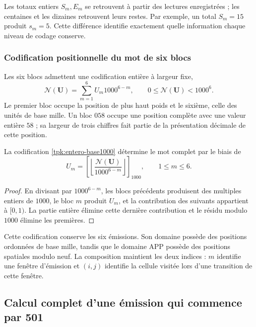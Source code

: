 Les totaux entiers \(S_m,E_m\) se retrouvent à partir des lectures enregistrées ;
les centaines et les dizaines retrouvent leurs restes. Par exemple, un total
\(S_m=15\) produit \(s_m=5\). Cette différence identifie exactement
quelle information chaque niveau de codage conserve.

\subsubsection{Codification positionnelle du mot de six blocs}

Les six blocs admettent une codification entière à largeur fixe,
\begin{equation}
 \mathscr N(\mathbf U)=\sum_{m=1}^{6}U_m1000^{6-m},
 \qquad0\leq\mathscr N(\mathbf U)<1000^6.
 \label{tpk:entero-base1000}
\end{equation}
Le premier bloc occupe la position de plus haut poids et le sixième, celle des unités de base mille. Un bloc \(058\) occupe une position complète avec une valeur entière \(58\) ; sa largeur de trois chiffres fait partie de la présentation décimale de cette position.

\begin{proposicion}
\label{tpk:inversa-base1000}
La codification \eqref{tpk:entero-base1000} détermine le mot complet
par le biais de
\[
 U_m=\left[\left\lfloor
 \frac{\mathscr N(\mathbf U)}{1000^{6-m}}\right\rfloor\right]_{1000},
 \qquad1\leq m\leq6.
\]
\end{proposicion}
\begin{proof}
En divisant par \(1000^{6-m}\), les blocs précédents produisent des multiples entiers de \(1000\), le bloc \(m\) produit \(U_m\), et la contribution des suivants appartient à \([0,1)\). La partie entière élimine cette dernière contribution et le résidu modulo \(1000\) élimine les premières.
\end{proof}

Cette codification conserve les six émissions. Son domaine possède des positions ordonnées de base mille, tandis que le domaine APP possède des positions spatiales modulo neuf. La composition maintient les deux indices : \(m\) identifie une fenêtre d'émission et \((i,j)\) identifie la cellule visitée lors d'une transition de cette fenêtre.

\subsection{Calcul complet d'une émission qui commence par 501}
\label{tpk:ejemplo501}

